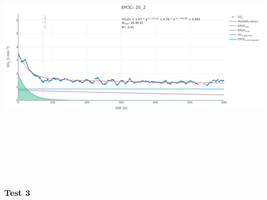 \documentclass[
  letterpaper,
  DIV=11]{scrartcl}
\begin{document}
\includegraphics[width=11.45833in,height=4.6875in]{images/20_2.png}

\subsubsection{Test 3}
\end{document}
